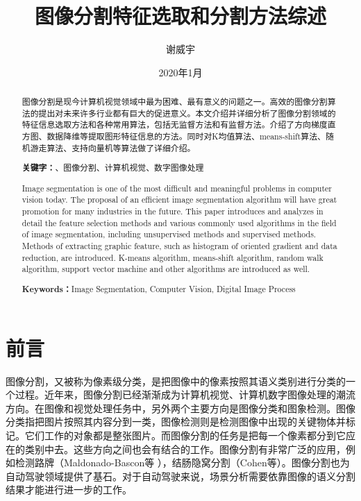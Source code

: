 \documentclass{article}
\title{图像分割特征选取和分割方法综述}
\author{谢威宇 }
\date{2020年1月}
\begin{document}
\maketitle

\begin{abstract}
图像分割是现今计算机视觉领域中最为困难、最有意义的问题之一。高效的图像分割算法的提出对未来许多行业都有巨大的促进意义。本文介绍并详细分析了图像分割领域的特征信息选取方法和各种常用算法，包括无监督方法和有监督方法。介绍了方向梯度直方图、数据降维等提取图形特征信息的方法。同时对K均值算法、means-shift算法、随机游走算法、支持向量机等算法做了详细介绍。

\textbf{关键字：}、图像分割、计算机视觉、数字图像处理
\end{abstract}


\renewcommand{\abstractname} {Abstract}
\begin{abstract}
Image segmentation is one of the most difficult and meaningful problems in computer vision today. The proposal of an efficient image segmentation algorithm will have great promotion for many industries in the future. This paper introduces and analyzes in detail the feature selection methods and various commonly used algorithms in the field of image segmentation, including unsupervised methods and supervised methods. Methods of extracting graphic feature, such as histogram of oriented gradient and data reduction, are introduced. K-means algorithm, means-shift algorithm, random walk algorithm, support vector machine and other algorithms are introduced as well.

\textbf{Keywords：}Image Segmentation, Computer Vision, Digital Image Process
\end{abstract}



\section{前言}
图像分割，又被称为像素级分类，是把图像中的像素按照其语义类别进行分类的一个过程。近年来，图像分割已经渐渐成为计算机视觉、计算机数字图像处理的潮流方向。在图像和视觉处理任务中，另外两个主要方向是图像分类和图象检测。图像分类指把图片按照其内容分到一类，图像检测则是检测图像中出现的关键物体并标记。它们工作的对象都是整张图片。而图像分割的任务是把每一个像素都分到它应在的类别中去。这些方向之间也会有结合的工作。图像分割有非常广泛的应用，例如检测路牌（Maldonado-Bascon等 \cite{4220659}），结肠隐窝分割（Cohen等\cite{COHEN2015150}）。图像分割也为自动驾驶领域提供了基石。对于自动驾驶来说，场景分析需要依靠图像的语义分割结果才能进行进一步的工作。
\newline
\end{document}
